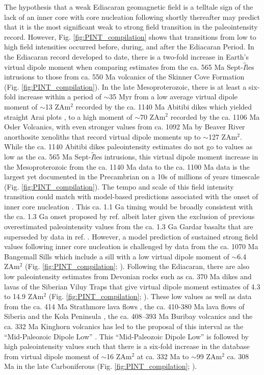 \documentclass[9pt,twocolumn,twoside,lineno]{pnas-new}
\begin{document}
The hypothesis that a weak Ediacaran geomagnetic field is a telltale sign of the lack of an inner core with core nucleation following shortly thereafter may predict that it is the most significant weak to strong field transition in the paleointensity record. However, Fig. \ref{fig:PINT_compilation} shows that transitions from low to high field intensities occurred before, during, and after the Ediacaran Period. In the Ediacaran record developed to date, there is a two-fold increase in Earth's virtual dipole moment when comparing estimates from the ca. 565 Ma Sept-$\hat{I}$les intrusions \cite{Bono2019a} to those from ca. 550 Ma volcanics of the Skinner Cove Formation \cite{Thallner2021a} (Fig. \ref{fig:PINT_compilation}). In the late Mesoproterozoic, there is at least a six-fold increase within a period of $\sim$35 Myr from a low average virtual dipole moment of $\sim$13 ZAm$^2$ recorded by the ca. 1140 Ma Abitibi dikes which yielded straight Arai plots \cite{Macouin2003a}, to a high moment of $\sim$70 ZAm$^2$ recorded by the ca. 1106 Ma Osler Volcanics, with even stronger values from ca. 1092 Ma by Beaver River anorthosite xenoliths that record virtual dipole moments up to $\sim$127 ZAm$^2$. While the ca. 1140 Abitibi dikes paleointensity estimates do not go to values as low as the ca. 565 Ma Sept-$\hat{I}$les intrusions, this virtual dipole moment increase in the Mesoproterozoic from the ca. 1140 Ma data to the ca. 1100 Ma data is the largest yet documented in the Precambrian on a 10s of millions of years timescale (Fig. \ref{fig:PINT_compilation}). The tempo and scale of this field intensity transition could match with model-based predictions associated with the onset of inner core nucleation \cite{Davies2021a}. This ca. 1.1 Ga timing would be broadly consistent with the ca. 1.3 Ga onset proposed by ref. \citealp{Biggin2015a} albeit later given the exclusion of previous overestimated paleointensity values from the ca. 1.3 Ga Gardar basalts that are superseded by data in ref. \citealp{Kodama2019a}. However, a model prediction of sustained strong field values following inner core nucleation is challenged by data from the ca. 1070 Ma Bangemall Sills which include a sill with a low virtual dipole moment of $\sim$6.4 ZAm$^2$ (Fig. \ref{fig:PINT_compilation};  \citealp{Lloyd2021b}). Following the Ediacaran, there are also low paleointensity estimates from Devonian rocks such as ca. 370 Ma dikes and lavas of the Siberian Viluy Traps that give virtual dipole moment estimates of 4.3 to 14.9 ZAm$^2$ (Fig. \ref{fig:PINT_compilation}; \citealp{Hawkins2019a}). These low values as well as data from the ca. 414 Ma Strathmore lava flows \cite{Hawkins2021a}, the ca. 410-380 Ma lava flows of Siberia and the Kola Peninsula \cite{Shcherbakova2017a}, the ca. 408–393 Ma Buribay volcanics \cite{Shcherbakova2021a} and the ca. 332 Ma Kinghorn volcanics \cite{Hawkins2021a} has led to the proposal of this interval as the ``Mid-Paleozoic Dipole Low'' \cite{Hawkins2021a}. This ``Mid-Paleozoic Dipole Low'' is followed by high paleointensity values such that there is a six-fold increase in the database from virtual dipole moment of $\sim$16 ZAm$^2$ at ca. 332 Ma to $\sim$99 ZAm$^2$ ca. 308 Ma in the late Carboniferous (Fig. \ref{fig:PINT_compilation}; \citealp{Hawkins2021a}). 
\end{document}
